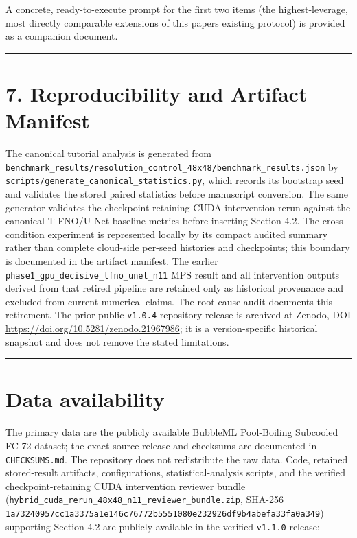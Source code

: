 \documentclass[preprint,12pt]{elsarticle}
\begin{document}
A concrete, ready-to-execute prompt for the first two items (the
highest-leverage, most directly comparable extensions of this
paper\textquotesingle s existing protocol) is provided as a companion
document.

\begin{center}\rule{0.5\linewidth}{0.5pt}\end{center}

\section*{7. Reproducibility and Artifact
Manifest}\label{7-reproducibility-and-artifact-manifest}

The canonical tutorial analysis is generated from
\texttt{benchmark\_results/resolution\_control\_48x48/benchmark\_results.json}
by \texttt{scripts/generate\_canonical\_statistics.py}, which records
its bootstrap seed and validates the stored paired statistics before
manuscript conversion. The same generator validates the
checkpoint-retaining CUDA intervention rerun against the canonical
T-FNO/U-Net baseline metrics before inserting Section 4.2. The
cross-condition experiment is represented locally by its compact audited
summary rather than complete cloud-side per-seed histories and
checkpoints; this boundary is documented in the artifact manifest. The
earlier \texttt{phase1\_gpu\_decisive\_tfno\_unet\_n11} MPS result and
all intervention outputs derived from that retired pipeline are retained
only as historical provenance and excluded from current numerical
claims. The root-cause audit documents this retirement. The prior public
\texttt{v1.0.4} repository release is archived at Zenodo, DOI
\url{https://doi.org/10.5281/zenodo.21967986}; it is a version-specific
historical snapshot and does not remove the stated limitations.

\begin{center}\rule{0.5\linewidth}{0.5pt}\end{center}

\section*{Data availability}\label{data-availability}

The primary data are the publicly available BubbleML Pool-Boiling
Subcooled FC-72 dataset; the exact source release and checksums are
documented in \texttt{CHECKSUMS.md}. The repository does not
redistribute the raw data. Code, retained stored-result artifacts,
configurations, statistical-analysis scripts, and the verified
checkpoint-retaining CUDA intervention reviewer bundle
(\texttt{hybrid\_cuda\_rerun\_48x48\_n11\_reviewer\_bundle.zip},
SHA-256 \texttt{1a73240957cc1a3375a1e146c76772b5551080e232926df9b4abefa33fa0a349})
supporting Section 4.2 are publicly available in the verified \texttt{v1.1.0} release:
\end{document}
